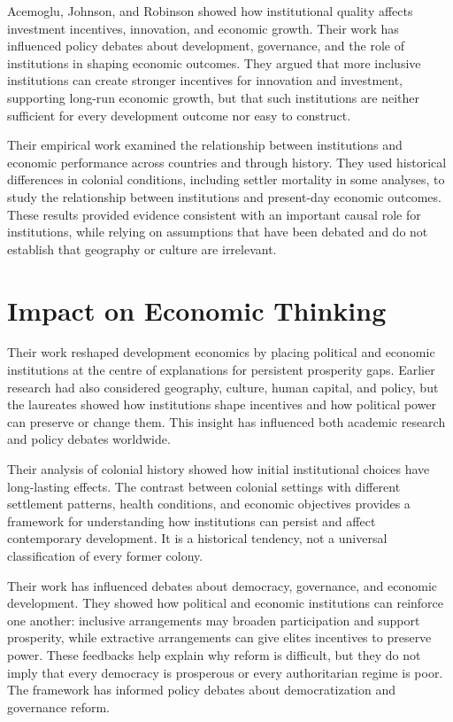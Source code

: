 Acemoglu, Johnson, and Robinson showed how institutional quality affects
investment incentives, innovation, and economic growth. Their work has
influenced policy debates about development, governance, and the role of
institutions in shaping economic outcomes. They argued that more inclusive
institutions can create stronger incentives for innovation and investment,
supporting long-run economic growth, but that such institutions are neither
sufficient for every development outcome nor easy to construct.

Their empirical work examined the relationship between institutions and
economic performance across countries and through history. They used historical
differences in colonial conditions, including settler mortality in some analyses,
to study the relationship between institutions and present-day economic outcomes.
These results provided evidence consistent with an important causal role for
institutions, while relying on assumptions that have been debated and do not
establish that geography or culture are irrelevant.

\section{Impact on Economic Thinking}
Their work reshaped development economics by placing political and economic
institutions at the centre of explanations for persistent prosperity gaps.
Earlier research had also considered geography, culture, human capital, and
policy, but the laureates showed how institutions shape incentives and how
political power can preserve or change them. This insight has influenced both
academic research and policy debates worldwide.

Their analysis of colonial history showed how initial institutional
choices have long-lasting effects. The contrast between colonial settings with
different settlement patterns, health conditions, and economic objectives
provides a framework for understanding how institutions can persist and affect
contemporary development. It is a historical tendency, not a universal
classification of every former colony.

Their work has influenced debates about democracy, governance, and economic
development. They showed how political and economic institutions can reinforce
one another: inclusive arrangements may broaden participation and support
prosperity, while extractive arrangements can give elites incentives to preserve
power. These feedbacks help explain why reform is difficult, but they do not
imply that every democracy is prosperous or every authoritarian regime is poor.
The framework has informed policy debates about democratization and governance
reform.

